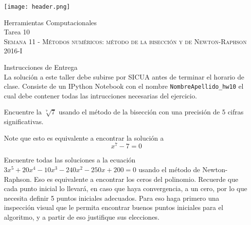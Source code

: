 \documentclass[11pt,letterpaper]{exam}
\begin{document}
\begin{center}

\texttt{[image: header.png]}

\vspace{1.0cm}
{\Large Herramientas Computacionales \\
 Tarea 10} \\
\textsc{Semana 11 - Métodos numéricos: método de la bisección y de Newton-Raphson }\\
2016-I\\
\end{center}



\vspace{0.5cm}

{\Large Instrucciones de Entrega}\\

\noindent
La solución a este taller debe subirse por SICUA antes de terminar 
el horario de clase.
\noindent
Consiste de un IPython Notebook con el nombre
\verb"NombreApellido_hw10"
el cual debe contener todas las intrucciones necesarias del ejercicio.

\begin{questions}


Encuentre la $\sqrt[7]{7} $ usando el método de la bisección con una precisión de 5 cifras significativas.

Note que esto es equivalente a encontrar la soluci\'on a 
\begin{equation}
x^{7} - 7 = 0
\end{equation}


Encuentre todas las soluciones a la ecuación $3x^5 + 20x^4 -10x^3 -240x^2 -250x +200 = 0$ usando el método de Newton-Raphson. Eso es equivalente a encontrar los ceros del polinomio. Recuerde que cada punto inicial lo llevará, en caso que haya convergencia, a un cero, por lo que necesita definir 5 puntos iniciales adecuados. Para eso haga primero una inspección visual que le permita encontrar buenos puntos iniciales para el algoritmo, y a partir de eso justifique sus elecciones.

\end{questions}
\end{document}
